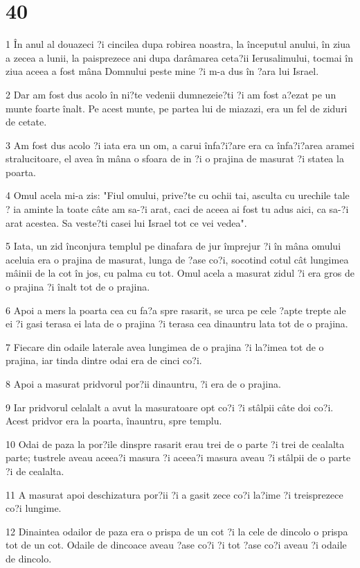 \chapter{40}

\par 1 În anul al douazeci ?i cincilea dupa robirea noastra, la începutul anului, în ziua a zecea a lunii, la paisprezece ani dupa darâmarea ceta?ii Ierusalimului, tocmai în ziua aceea a fost mâna Domnului peste mine ?i m-a dus în ?ara lui Israel.
\par 2 Dar am fost dus acolo în ni?te vedenii dumnezeie?ti ?i am fost a?ezat pe un munte foarte înalt. Pe acest munte, pe partea lui de miazazi, era un fel de ziduri de cetate.
\par 3 Am fost dus acolo ?i iata era un om, a carui înfa?i?are era ca înfa?i?area aramei stralucitoare, el avea în mâna o sfoara de in ?i o prajina de masurat ?i statea la poarta.
\par 4 Omul acela mi-a zis: "Fiul omului, prive?te cu ochii tai, asculta cu urechile tale ? ia aminte la toate câte am sa-?i arat, caci de aceea ai fost tu adus aici, ca sa-?i arat acestea. Sa veste?ti casei lui Israel tot ce vei vedea".
\par 5 Iata, un zid înconjura templul pe dinafara de jur împrejur ?i în mâna omului aceluia era o prajina de masurat, lunga de ?ase co?i, socotind cotul cât lungimea mâinii de la cot în jos, cu palma cu tot. Omul acela a masurat zidul ?i era gros de o prajina ?i înalt tot de o prajina.
\par 6 Apoi a mers la poarta cea cu fa?a spre rasarit, se urca pe cele ?apte trepte ale ei ?i gasi terasa ei lata de o prajina ?i terasa cea dinauntru lata tot de o prajina.
\par 7 Fiecare din odaile laterale avea lungimea de o prajina ?i la?imea tot de o prajina, iar tinda dintre odai era de cinci co?i.
\par 8 Apoi a masurat pridvorul por?ii dinauntru, ?i era de o prajina.
\par 9 Iar pridvorul celalalt a avut la masuratoare opt co?i ?i stâlpii câte doi co?i. Acest pridvor era la poarta, înauntru, spre templu.
\par 10 Odai de paza la por?ile dinspre rasarit erau trei de o parte ?i trei de cealalta parte; tustrele aveau aceea?i masura ?i aceea?i masura aveau ?i stâlpii de o parte ?i de cealalta.
\par 11 A masurat apoi deschizatura por?ii ?i a gasit zece co?i la?ime ?i treisprezece co?i lungime.
\par 12 Dinaintea odailor de paza era o prispa de un cot ?i la cele de dincolo o prispa tot de un cot. Odaile de dincoace aveau ?ase co?i ?i tot ?ase co?i aveau ?i odaile de dincolo.
